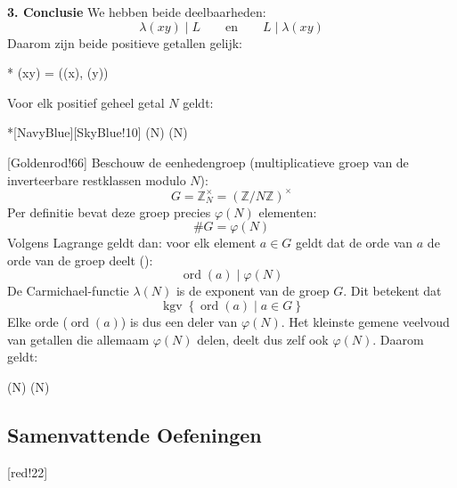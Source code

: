 \textbf{3. Conclusie} \newline
We hebben beide deelbaarheden:
\begin{equation*}
    \lambda(xy) \mid L \qquad \text{en} \qquad L \mid \lambda(xy)
\end{equation*}
Daarom zijn beide positieve getallen gelijk:
\begin{equationbox}*
    \lambda(xy) = \left(\lambda(x), \lambda(y)\right)
\end{equationbox}


Voor elk positief geheel getal $N$ geldt:

\begin{equationbox}*[NavyBlue][SkyBlue!10]
    \lambda(N) \mid \varphi(N)
\end{equationbox}

[Goldenrod!66] Beschouw de eenhedengroep (multiplicatieve groep van de inverteerbare restklassen modulo $N$):
\begin{equation*}
    G = \mathbb{Z}_N^\times = \left(\mathbb{Z}/N\mathbb{Z}\right)^\times
\end{equation*}
Per definitie bevat deze groep precies $\varphi(N)$ elementen:
\begin{equation*}
    \#G = \varphi(N)
\end{equation*}
Volgens Lagrange geldt dan: voor elk element $a \in G$ geldt dat de orde van $a$ de orde van de groep deelt ():
\begin{equation*}
    \operatorname{ord}(a) \mid \varphi(N)
\end{equation*}
De Carmichael-functie $\lambda(N)$ is de exponent van de groep $G$. Dit betekent dat
\begin{equation*}
    \operatorname{kgv}\left\{\operatorname{ord}(a) \mid a \in G\right\}
\end{equation*}
Elke orde ($\operatorname{ord}(a)$) is dus een deler van $\varphi(N)$. Het kleinste gemene veelvoud van getallen die allemaam $\varphi(N)$ delen, deelt dus zelf ook $\varphi(N)$. Daarom geldt:
\begin{equationbox}
    \lambda(N) \mid \varphi(N)
\end{equationbox}

\subsection{Samenvattende Oefeningen}

 [red!22] 










